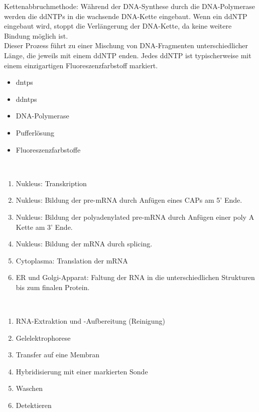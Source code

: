 Kettenabbruchmethode: Während der DNA-Synthese durch die DNA-Polymerase werden die ddNTPs in die wachsende DNA-Kette eingebaut. Wenn ein ddNTP eingebaut wird, stoppt die Verlängerung der DNA-Kette, da keine weitere Bindung möglich ist. \\ Dieser Prozess führt zu einer Mischung von DNA-Fragmenten unterschiedlicher Länge, die jeweils mit einem ddNTP enden. Jedes ddNTP ist typischerweise mit einem einzigartigen Fluoreszenzfarbstoff markiert. \\ \newline

\begin{itemize}
    \item \glspl{dntp}
    \item \glspl{ddntp}
    \item DNA-\gls{Polymerase}
    \item Pufferlösung
    \item Fluoreszenzfarbstoffe
\end{itemize} $\ $ \\

\begin{enumerate}
    \item Nukleus: Transkription
    \item Nukleus: Bildung der pre-mRNA durch Anfügen eines CAPs am 5' Ende.
    \item Nukleus: Bildung der polyadenylated
pre-mRNA durch Anfügen einer poly A Kette am 3' Ende.
    \item Nukleus: Bildung der mRNA durch splicing.
    \item Cytoplasma: Translation der mRNA
    \item ER und Golgi-Apparat: Faltung der RNA in die unterschiedlichen Strukturen bis zum finalen Protein.
\end{enumerate} $\ $ \\

\begin{enumerate}
    \item RNA-Extraktion und -Aufbereitung (Reinigung)
    \item Gelelektrophorese
    \item Transfer auf eine Membran
    \item Hybridisierung mit einer markierten Sonde
    \item Waschen
    \item Detektieren
\end{enumerate} $\ $ \\


